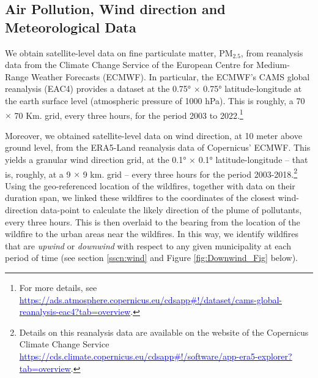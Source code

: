 \documentclass[11pt]{article}
\begin{document}
\begin{spacing}{1.3}
\subsection{Air Pollution, Wind direction and Meteorological Data}
\label{sscn:airdata}

 
We obtain satellite-level data on fine particulate matter, PM$_{2.5}$, from reanalysis data from the Climate Change Service of the European Centre for Medium-Range Weather Forecasts (ECMWF). In particular, the ECMWF's CAMS global reanalysis (EAC4) provides a dataset at the 0.75° $\times$ 0.75° latitude-longitude at the earth surface level (atmospheric pressure of 1000 hPa). This is roughly, a 70 $\times$ 70 Km. grid, every three hours, for the period 2003 to 2022.\footnote{For more details, see \hyperlink{https://ads.atmosphere.copernicus.eu/cdsapp\#!/dataset/cams-global-reanalysis-eac4?tab=overview}{\textcolor{blue}{https://ads.atmosphere.copernicus.eu/cdsapp\#!/dataset/cams-global-reanalysis-eac4?tab=overview}}.}


Moreover, we obtained satellite-level data on wind direction, at 10 meter above ground level, from the ERA5-Land reanalysis data of Copernicus' ECMWF. This yields a granular wind direction grid, at the 0.1° $\times$ 0.1° latitude-longitude -- that is, roughly, at a 9 $\times$ 9 km. grid -- every three hours for the period 2003-2018.\footnote{Details on this reanalysis data are available on the website of the Copernicus Climate Change Service \hyperlink{https://cds.climate.copernicus.eu/cdsapp\#!/software/app-era5-explorer?tab=overview}{\textcolor{blue}{https://cds.climate.copernicus.eu/cdsapp\#!/software/app-era5-explorer?tab=overview}}.} Using the geo-referenced location of the wildfires, together with data on their duration span, we linked these wildfires to the coordinates of the closest wind-direction data-point to calculate the likely direction of the plume of pollutants, every three hours. This is then overlaid to the bearing from the location of the wildfire to the urban areas near the wildfires. In this way, we identify wildfires that are \textit{upwind} or \textit{downwind} with respect to any given municipality at each period of time (see section \ref{sscn:wind} and Figure \ref{fig:Downwind_Fig} below). 



\end{spacing}
\end{document}
